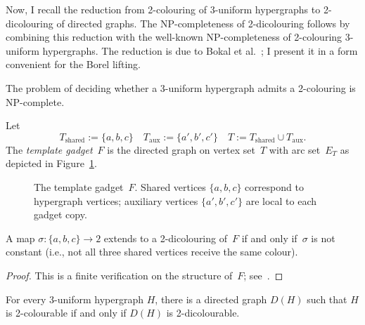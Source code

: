Now, I recall the reduction from 2-colouring of 3-uniform hypergraphs to 2-dicolouring of directed graphs.
The NP-completeness of 2-dicolouring follows by combining this reduction with the well-known NP-completeness of 2-colouring 3-uniform hypergraphs.
The reduction is due to Bokal et al.~\cite{Bokal_2004_CircularChrom}; I present it in a form convenient for the Borel lifting.

\begin{fact}\label{fact:hyp-np}
	The problem of deciding whether a 3-uniform hypergraph admits a 2-colouring is NP-complete.
\end{fact}
 
\begin{definition}\label{def:gadget}
	Let $$T_{\mathrm{shared}}:=\{a,b,c\}\quad T_{\mathrm{aux}}:=\{a',b',c'\}\quad T:=T_{\mathrm{shared}}\cup T_{\mathrm{aux}}.$$
	The \emph{template gadget}~$F$ is the directed graph on vertex set~$T$ with arc set~$E_T$ as depicted in Figure~\ref{fig:gadget}.
\end{definition}

\begin{figure}[ht]
    \centering
    
    \caption{The template gadget~$F$. Shared vertices $\{a,b,c\}$ correspond to hypergraph vertices; auxiliary vertices $\{a',b',c'\}$ are local to each gadget copy.}
    \label{fig:gadget}
\end{figure}

\begin{lemma}\label{lemma:gadget-property}
A map $\sigma\colon\{a,b,c\}\to 2$ extends to a 2-dicolouring of~$F$ if and only if~$\sigma$ is not constant (i.e., not all three shared vertices receive the same colour).
\end{lemma}

\begin{proof}
	This is a finite verification on the structure of~$F$; see~\cite[Theorem~3.1]{Bokal_2004_CircularChrom}.
\end{proof}

\begin{lemma}\label{lem:classical}
For every 3-uniform hypergraph $H$, there is a directed graph $D(H)$ such that $H$ is 2-colourable if and only if $D(H)$ is 2-dicolourable.
\end{lemma}

